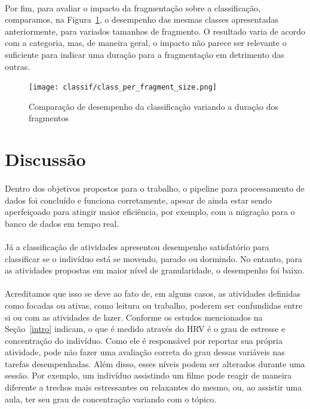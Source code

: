             \paragraph{} Por fim, para avaliar o impacto da fragmentação sobre a classificação, comparamos, na Figura~\ref{class_per_fragment}, o desempenho das mesmas classes apresentadas anteriormente, para variados tamanhos de fragmento. O resultado varia de acordo com a categoria, mas, de maneira geral, o impacto não parece ser relevante o suficiente para indicar uma duração para a fragmentação em detrimento das outras.
            
            \begin{figure}[h!]
            	\centering
            	\texttt{[image: classif/class\_per\_fragment\_size.png]}
            	\caption{Comparação de desempenho da classificação variando a duração dos fragmentos}
                \label{class_per_fragment}
            \end{figure}            
            


    \section{Discussão}
    \label{Dicussion}
    
        \paragraph{} Dentro dos objetivos propostos para o trabalho, o pipeline para processamento de dados foi concluído e funciona corretamente, apesar de ainda estar sendo aperfeiçoado para atingir maior eficiência, por exemplo, com a migração para o banco de dados em tempo real.
    
        \paragraph{} Já a classificação de atividades apresentou desempenho satisfatório para classificar se o indivíduo está se movendo, parado ou dormindo. No entanto, para as atividades propostas em maior nível de granularidade, o desempenho foi baixo.
        
         \paragraph{} Acreditamos que isso se deve ao fato de, em alguns casos, as atividades definidas como focadas ou ativas, como leitura ou trabalho, poderem ser confundidas entre si ou com as atividades de lazer.  Conforme os estudos mencionados na Seção~\ref{intro} indicam, o que é medido através do HRV é o grau de estresse e concentração do indivíduo. Como ele é responsável por reportar sua própria atividade, pode não fazer uma avaliação correta do grau dessas variáveis nas tarefas desempenhadas. Além disso, esses níveis podem ser alterados durante uma sessão. Por exemplo, um indivíduo assistindo um filme pode reagir de maneira diferente a trechos mais estressantes ou relaxantes do mesmo, ou, ao assistir uma aula, ter seu grau de concentração variando com o tópico.
         
